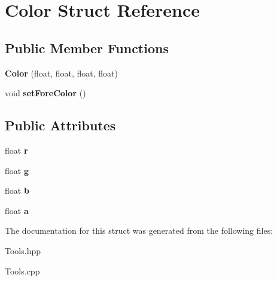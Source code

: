 \hypertarget{struct_color}{}\section{Color Struct Reference}
\label{struct_color}
\subsection*{Public Member Functions}
\begin{DoxyCompactItemize}
\item 
\hypertarget{struct_color_a90c33a7c6af6542e917c8fb136c59bd3}{}\label{struct_color_a90c33a7c6af6542e917c8fb136c59bd3} 
{\bfseries Color} (float, float, float, float)
\item 
\hypertarget{struct_color_ab277df545876e66a8094fd5d3dbbcaf2}{}\label{struct_color_ab277df545876e66a8094fd5d3dbbcaf2} 
void {\bfseries set\+Fore\+Color} ()
\end{DoxyCompactItemize}
\subsection*{Public Attributes}
\begin{DoxyCompactItemize}
\item 
\hypertarget{struct_color_a3958a556b47d2de3dd45c75aac833c20}{}\label{struct_color_a3958a556b47d2de3dd45c75aac833c20} 
float {\bfseries r}
\item 
\hypertarget{struct_color_a5defbb21620e480e556181772d665f34}{}\label{struct_color_a5defbb21620e480e556181772d665f34} 
float {\bfseries g}
\item 
\hypertarget{struct_color_a33e482be18d6ea31d2b403bee13683b7}{}\label{struct_color_a33e482be18d6ea31d2b403bee13683b7} 
float {\bfseries b}
\item 
\hypertarget{struct_color_a98047aee65fc3d825f88a76da728fd27}{}\label{struct_color_a98047aee65fc3d825f88a76da728fd27} 
float {\bfseries a}
\end{DoxyCompactItemize}


The documentation for this struct was generated from the following files\+:\begin{DoxyCompactItemize}
\item 
Tools.\+hpp\item 
Tools.\+cpp\end{DoxyCompactItemize}

